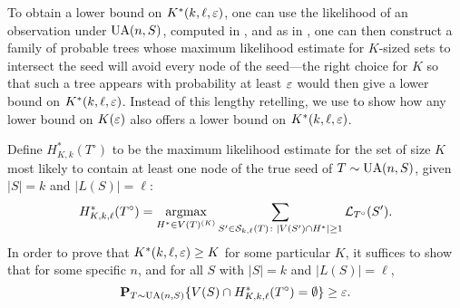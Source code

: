 To obtain a lower bound on $K^*(k, \ell, \varepsilon)$, one can use the
likelihood of an observation under $\operatorname{UA}(n, S)$, computed in
, and as in \cite[Theorem 4]{finding-adam}, one can then
construct a family of probable trees whose maximum likelihood estimate
for $K$-sized sets to intersect the seed will avoid every node of the
seed---the right choice for $K$ so that such a tree appears with
probability at least $\varepsilon$ would then give a lower bound on
$K^*(k, \ell, \varepsilon)$. Instead of this lengthy retelling, we use
 to show how any lower bound on $K(\varepsilon)$
also offers a lower bound on $K^*(k, \ell, \varepsilon)$.

Define $H^*_{K, k}(T^\circ)$ to be the maximum likelihood estimate for
the set of size $K$ most likely to contain at least one node of the
true seed of $T \sim \operatorname{UA}(n, S)$, given $|S| = k$ and $|L(S)| = \ell$:
\[
  H^*_{K, k, \ell}(T^\circ) = \operatorname*{argmax}_{H^* \in V(T)^{(K)}} \sum_{S' \in
    \mathcal{S}_{k, \ell}(T) \colon |V(S') \cap H^*| \ge 1} \mathcal{L}_{T^\circ}(S') .
\]
In order to prove that $K^*(k, \ell, \varepsilon) \ge K$ for some particular
$K$, it suffices to show that for some specific $n$, and for all $S$
with $|S| = k$ and $|L(S)| = \ell$,
\[
  \operatorname{\mathbf{P}}_{T \sim \operatorname{UA}(n, S)}\{V(S) \cap H_{K, k, \ell}^*(T^\circ) = \emptyset\}
  \ge \varepsilon .
\]

